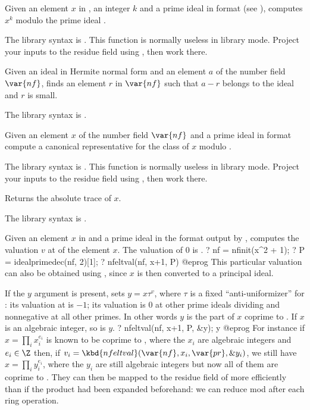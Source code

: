 \label{se:nfeltpowmodpr}
Given an element $x$ in , an integer $k$ and a prime ideal
 in  format
(see ), computes $x^k$ modulo the prime ideal .

The library syntax is .
This function is normally useless in library mode. Project your
inputs to the residue field using , then work there.

\label{se:nfeltreduce}
Given an ideal  in
Hermite normal form and an element $a$ of the number field $\var{nf}$,
finds an element $r$ in $\var{nf}$ such that $a-r$ belongs to the ideal
and $r$ is small.

The library syntax is .

\label{se:nfeltreducemodpr}
Given an element $x$ of the number field $\var{nf}$ and a prime ideal
 in  format compute a canonical representative for the
class of $x$ modulo .

The library syntax is .
This function is normally useless in library mode. Project your
inputs to the residue field using , then work there.

\label{se:nfelttrace}
Returns the absolute trace of $x$.

The library syntax is .

\label{se:nfeltval}
Given an element $x$ in
 and a prime ideal  in the format output by
, computes the valuation $v$ at  of the
element $x$. The valuation of $0$ is .
\bprog
? nf = nfinit(x^2 + 1);
? P = idealprimedec(nf, 2)[1];
? nfeltval(nf, x+1, P)
@eprog\noindent
This particular valuation can also be obtained using
, since $x$ is then converted to a
principal ideal.

If the $y$ argument is present, sets $y = x \tau^v$, where $\tau$ is a
fixed ``anti-uniformizer'' for : its valuation at  is $-1$;
its valuation is $0$ at other prime ideals dividing  and
nonnegative at all other primes. In other words $y$ is the part of $x$
coprime to . If $x$ is an algebraic integer, so is $y$.
\bprog
? nfeltval(nf, x+1, P, &y); y
@eprog
For instance if $x = \prod_i x_i^{e_i}$ is known to be coprime to ,
where the $x_i$ are algebraic integers and $e_i\in\Z$ then,
if $v_i = \kbd{nfeltval}(\var{nf}, x_i, \var{pr}, \&y_i)$, we still
have $x = \prod_i y_i^{e_i}$, where the $y_i$ are still algebraic integers
but now all of them are coprime to . They can then be mapped to
the residue field of  more efficiently than if the product had
been expanded beforehand: we can reduce mod  after each ring
operation.

